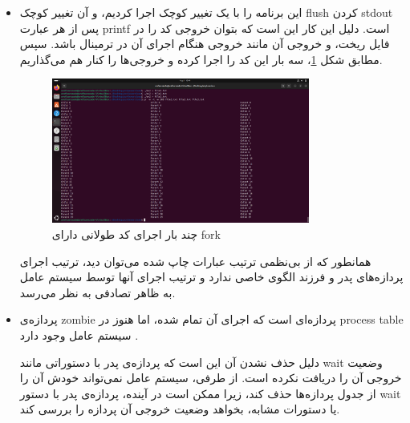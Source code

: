 \documentclass[12pt]{article}
\begin{document}
\begin{itemize}
        \item 
        این برنامه را با یک تغییر کوچک اجرا کردیم، و آن تغییر کوچک
        \textenglish{flush}
        کردن 
        \textenglish{stdout}
        پس از هر عبارت
        \textenglish{printf}
        است. دلیل این کار این است که بتوان خروجی کد را در فایل ریخت، و خروجی آن مانند خروجی هنگام اجرای آن در ترمینال باشد. سپس مطابق شکل
        \ref{im14}،
        سه بار این کد را اجرا کرده و خروجی‌ها را کنار هم می‌گذاریم.

        \begin{figure}[H]
		\centering
		\includegraphics[width=0.8\textwidth]{report4-resources/14.png}
		\caption{چند بار اجرای کد طولانی دارای \textenglish{fork}}
            \label{im14}
	\end{figure}

        همانطور که از بی‌نظمی ترتیب عبارات چاپ شده می‌توان دید، ترتیب اجرای پردازه‌های پدر و فرزند الگوی خاصی ندارد و ترتیب اجرای آنها توسط سیستم عامل به ظاهر تصادفی به نظر می‌رسد.

        \item 
        پردازه‌ی
        \textenglish{zombie}
        پردازه‌ای است که اجرای آن تمام شده، اما هنوز در 
        \textenglish{process table}
        سیستم عامل وجود دارد
        \cite{wikipedia-zombie-process}.

        دلیل حذف نشدن آن این است که پردازه‌ی پدر با دستوراتی مانند 
        \textenglish{wait}
        وضعیت خروجی آن را دریافت نکرده است. از طرفی، سیستم عامل نمی‌تواند خودش آن را از جدول پردازه‌ها حذف کند، زیرا ممکن است در آینده، پردازه‌ی پدر با دستور
        \textenglish{wait}
        یا دستورات مشابه، بخواهد وضعیت خروجی آن پردازه را بررسی کند.

        
        \end{itemize}

        
        
	
	\newpage
	\begin{LTR}
		\begin{english}
\printbibliography[title={مراجع}]
\end{english}
	\end{LTR}

	
\end{document}
